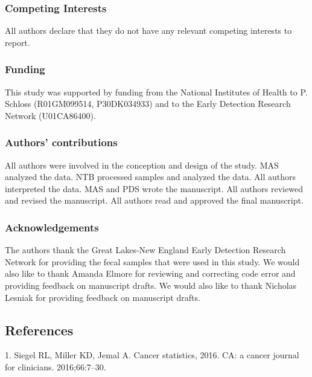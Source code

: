 \documentclass[12pt,]{article}
\begin{document}
\subsubsection{Competing Interests}\label{competing-interests}

All authors declare that they do not have any relevant competing
interests to report.

\subsubsection{Funding}\label{funding}

This study was supported by funding from the National Institutes of
Health to P. Schloss (R01GM099514, P30DK034933) and to the Early
Detection Research Network (U01CA86400).

\subsubsection{Authors' contributions}\label{authors-contributions}

All authors were involved in the conception and design of the study. MAS
analyzed the data. NTB processed samples and analyzed the data. All
authors interpreted the data. MAS and PDS wrote the manuscript. All
authors reviewed and revised the manuscript. All authors read and
approved the final manuscript.

\subsubsection{Acknowledgements}\label{acknowledgements}

The authors thank the Great Lakes-New England Early Detection Research
Network for providing the fecal samples that were used in this study. We
would also like to thank Amanda Elmore for reviewing and correcting code
error and providing feedback on manuscript drafts. We would also like to
thank Nicholas Lesniak for providing feedback on manuscript drafts.

\newpage

\subsection*{References}\label{references}

\hypertarget{refs}{}
\hypertarget{ref-siegel_cancer_2016}{}
1. Siegel RL, Miller KD, Jemal A. Cancer statistics, 2016. CA: a cancer
journal for clinicians. 2016;66:7--30.
\end{document}
